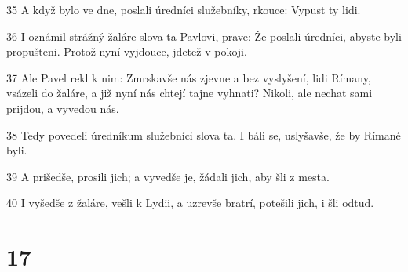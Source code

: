 \par 35 A když bylo ve dne, poslali úredníci služebníky, rkouce: Vypust ty lidi.
\par 36 I oznámil strážný žaláre slova ta Pavlovi, prave: Že poslali úredníci, abyste byli propušteni. Protož nyní vyjdouce, jdetež v pokoji.
\par 37 Ale Pavel rekl k nim: Zmrskavše nás zjevne a bez vyslyšení, lidi Rímany, vsázeli do žaláre, a již nyní nás chtejí tajne vyhnati? Nikoli, ale nechat sami prijdou, a vyvedou nás.
\par 38 Tedy povedeli úredníkum služebníci slova ta. I báli se, uslyšavše, že by Rímané byli.
\par 39 A prišedše, prosili jich; a vyvedše je, žádali jich, aby šli z mesta.
\par 40 I vyšedše z žaláre, vešli k Lydii, a uzrevše bratrí, potešili jich, i šli odtud.

\chapter{17}


